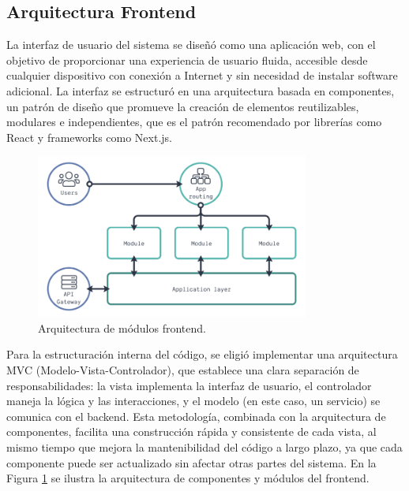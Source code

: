 \subsection{Arquitectura Frontend}

La interfaz de usuario del sistema se diseñó como una aplicación web, con el objetivo de proporcionar una experiencia de usuario fluida, accesible desde cualquier dispositivo con conexión a Internet y sin necesidad de instalar software adicional. La interfaz se estructuró en una arquitectura basada en componentes, un patrón de diseño que promueve la creación de elementos reutilizables, modulares e independientes, que es el patrón recomendado por librerías como React y frameworks como Next.js.

\begin{figure}[!htb]
\centering
\includegraphics[width=0.8\textwidth]{Figures/frontend-architecture.png}
\caption{Arquitectura de módulos frontend.}
\label{fig:frontend-architecture}
\end{figure}

Para la estructuración interna del código, se eligió implementar una arquitectura MVC (Modelo-Vista-Controlador), que establece una clara separación de responsabilidades: la vista implementa la interfaz de usuario, el controlador maneja la lógica y las interacciones, y el modelo (en este caso, un servicio) se comunica con el backend. Esta metodología, combinada con la arquitectura de componentes, facilita una construcción rápida y consistente de cada vista, al mismo tiempo que mejora la mantenibilidad del código a largo plazo, ya que cada componente puede ser actualizado sin afectar otras partes del sistema. En la Figura \ref{fig:frontend-architecture} se ilustra la arquitectura de componentes y módulos del frontend.

